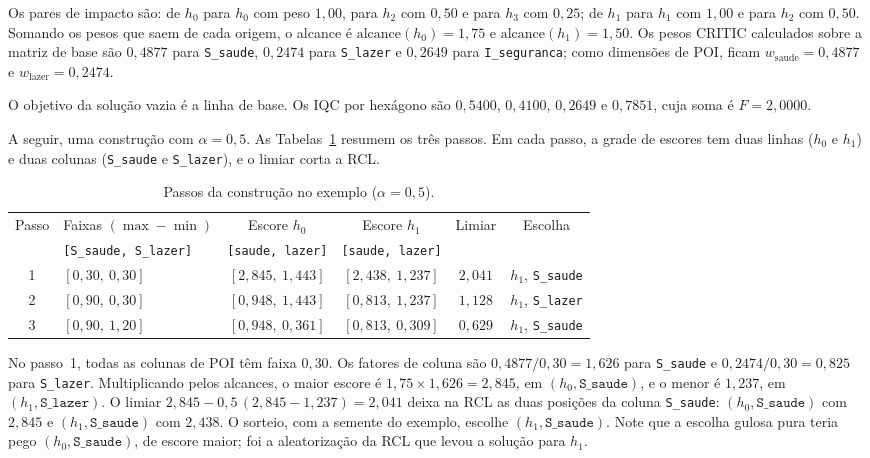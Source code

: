 \documentclass[11pt,a4paper]{article}
\newcommand{\code}[1]{\texttt{#1}}
\begin{document}
Os pares de impacto são: de $h_0$ para $h_0$ com peso $1{,}00$, para $h_2$ com $0{,}50$ e para $h_3$ com $0{,}25$; de $h_1$ para $h_1$ com $1{,}00$ e para $h_2$ com $0{,}50$. Somando os pesos que saem de cada origem, o alcance é $\text{alcance}(h_0) = 1{,}75$ e $\text{alcance}(h_1) = 1{,}50$. Os pesos CRITIC calculados sobre a matriz de base são $0{,}4877$ para \code{S\_saude}, $0{,}2474$ para \code{S\_lazer} e $0{,}2649$ para \code{I\_seguranca}; como dimensões de POI, ficam $w_{\text{saude}} = 0{,}4877$ e $w_{\text{lazer}} = 0{,}2474$.

O objetivo da solução vazia é a linha de base. Os IQC por hexágono são $0{,}5400$, $0{,}4100$, $0{,}2649$ e $0{,}7851$, cuja soma é $F = 2{,}0000$.

A seguir, uma construção com $\alpha = 0{,}5$. As Tabelas~\ref{tab:toy-step} resumem os três passos. Em cada passo, a grade de escores tem duas linhas ($h_0$ e $h_1$) e duas colunas (\code{S\_saude} e \code{S\_lazer}), e o limiar corta a RCL.

\begin{table}[h]
\centering
\caption{Passos da construção no exemplo ($\alpha = 0{,}5$).}
\label{tab:toy-step}
\begin{tabular}{@{}clcccc@{}}
\toprule
Passo & \multicolumn{1}{c}{Faixas $(\max-\min)$} & Escore $h_0$ & Escore $h_1$ & Limiar & Escolha \\
& \code{[S\_saude, S\_lazer]} & \code{[saude, lazer]} & \code{[saude, lazer]} & & \\
\midrule
1 & $[0{,}30,\ 0{,}30]$ & $[2{,}845,\ 1{,}443]$ & $[2{,}438,\ 1{,}237]$ & $2{,}041$ & $h_1$, \code{S\_saude} \\
2 & $[0{,}90,\ 0{,}30]$ & $[0{,}948,\ 1{,}443]$ & $[0{,}813,\ 1{,}237]$ & $1{,}128$ & $h_1$, \code{S\_lazer} \\
3 & $[0{,}90,\ 1{,}20]$ & $[0{,}948,\ 0{,}361]$ & $[0{,}813,\ 0{,}309]$ & $0{,}629$ & $h_1$, \code{S\_saude} \\
\bottomrule
\end{tabular}
\end{table}

No passo~1, todas as colunas de POI têm faixa $0{,}30$. Os fatores de coluna são $0{,}4877/0{,}30 = 1{,}626$ para \code{S\_saude} e $0{,}2474/0{,}30 = 0{,}825$ para \code{S\_lazer}. Multiplicando pelos alcances, o maior escore é $1{,}75 \times 1{,}626 = 2{,}845$, em $(h_0, \code{S\_saude})$, e o menor é $1{,}237$, em $(h_1, \code{S\_lazer})$. O limiar $2{,}845 - 0{,}5\,(2{,}845 - 1{,}237) = 2{,}041$ deixa na RCL as duas posições da coluna \code{S\_saude}: $(h_0, \code{S\_saude})$ com $2{,}845$ e $(h_1, \code{S\_saude})$ com $2{,}438$. O sorteio, com a semente do exemplo, escolhe $(h_1, \code{S\_saude})$. Note que a escolha gulosa pura teria pego $(h_0, \code{S\_saude})$, de escore maior; foi a aleatorização da RCL que levou a solução para $h_1$.
\end{document}
